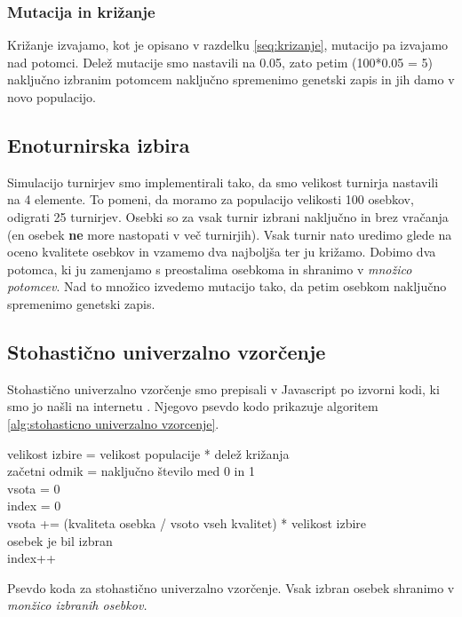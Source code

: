 \documentclass[a4paper, 12pt]{book}
\begin{document}
\subsubsection{Mutacija in kri\v zanje}

Kri\v zanje izvajamo, kot je opisano v razdelku \ref{seq:krizanje}, mutacijo pa izvajamo nad potomci. Dele\v z mutacije smo nastavili na 0.05, zato petim (100*0.05 = 5) naklju\v cno izbranim potomcem naklju\v cno spremenimo genetski zapis in jih damo v novo populacijo.

\subsection{Enoturnirska izbira}

Simulacijo turnirjev smo implementirali tako, da smo velikost turnirja nastavili na 4 elemente. To pomeni, da moramo za populacijo velikosti 100 osebkov, odigrati 25 turnirjev. Osebki so za vsak turnir izbrani naklju\v cno in brez vra\v canja (en osebek \textbf{ne} more nastopati v ve\v c turnirjih). Vsak turnir nato uredimo glede na oceno kvalitete osebkov in vzamemo dva najbolj\v sa ter ju kri\v zamo. Dobimo dva potomca, ki ju zamenjamo s preostalima osebkoma in shranimo v \emph{mno\v zico potomcev}. Nad to mno\v zico izvedemo mutacijo tako, da petim osebkom naklju\v cno spremenimo genetski zapis.

\subsection{Stohasti\v cno univerzalno vzor\v cenje}

Stohasti\v cno univerzalno vzor\v cenje smo prepisali v Javascript po izvorni kodi, ki smo jo na\v sli na internetu
\cite{github-stohasticno}. Njegovo psevdo kodo prikazuje algoritem \ref{alg:stohasticno univerzalno vzorcenje}.

\begin{algorithm}
\SetAlgoLined

velikost izbire = velikost populacije * dele\v z kri\v zanja\\
za\v cetni odmik = naklju\v cno \v stevilo med 0 in 1\\
vsota = 0\\
index = 0\\
{
	vsota += (kvaliteta osebka / vsoto vseh kvalitet) * velikost izbire\\
	{
		osebek je bil izbran\\
		index++
	}
}
\caption{Psevdo koda za stohasti\v cno univerzalno vzor\v cenje. Vsak izbran osebek shranimo v \textit{mon\v zico izbranih osebkov.}}
\label{alg:stohasticno univerzalno vzorcenje}
\end{algorithm}
\end{document}
